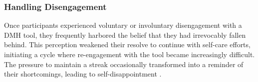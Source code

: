 \subsubsection{Handling Disengagement}
Once participants experienced voluntary or involuntary disengagement with a DMH tool, they frequently harbored the belief that they had irrevocably fallen behind.  This perception weakened their resolve to continue with self-care efforts, initiating a cycle where re-engagement with the tool became increasingly difficult. The pressure to maintain a streak occasionally transformed into a reminder of their shortcomings, leading to self-disappointment \cite{bekk2022all, toda2017dark, hadi2022gamification}.  %



